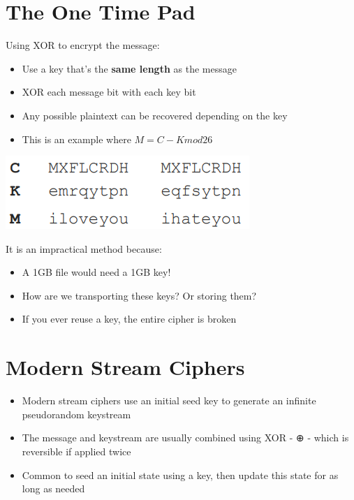 \documentclass{article}
\begin{document}
\section{The One Time Pad}
\begin{flushleft}
Using XOR to encrypt the message:
\begin{itemize}
  \item Use a key that’s the \textbf{same length} as the message 
  \item XOR each message bit with each key bit
  \item Any possible plaintext can be recovered depending on the key
  \item This is an example where $M = C - K mod 26$
\end{itemize}
\end{flushleft}
\begin{center}
  \includegraphics[scale=0.5]{one_time-pad.png}
\end{center}
\begin{flushleft}
It is an impractical method because:
\end{flushleft}
\begin{itemize}
  \item A 1GB file would need a 1GB key! 
  \item How are we transporting these keys? Or storing them? 
  \item If you ever reuse a key, the entire cipher is broken
\end{itemize}

\section{Modern Stream Ciphers}
\begin{itemize}
  \item Modern stream ciphers use an initial seed key to generate an infinite pseudorandom keystream 
  \item The message and keystream are usually combined using XOR - ⊕ - which is reversible if applied twice
  \item Common to seed an initial state using a key, then update this state for as long as needed
\end{itemize}
\end{document}
